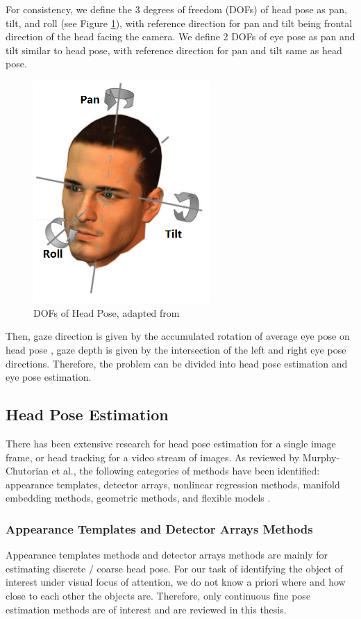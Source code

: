 For consistency, we define the 3 degrees of freedom (DOFs) of head pose as pan, tilt, and roll (see Figure \ref{fig:murphy2009head}), with reference direction for pan and tilt being frontal direction of the head facing the camera.  We define 2 DOFs of eye pose as pan and tilt similar to head pose, with reference direction for pan and tilt same as head pose.
\begin{figure} [h]
	\centering
	\includegraphics[width=0.6\textwidth]{./img/murphy2009head.png}
	\caption{DOFs of Head Pose, adapted from \cite{murphy2009head}}
	\label{fig:murphy2009head}
\end{figure}


Then, gaze direction is given by the accumulated rotation of average eye pose on head pose \cite{funes2013person}, gaze depth is given by the intersection of the left and right eye pose directions.  Therefore, the problem can be divided into head pose estimation and eye pose estimation.


\subsection{Head Pose Estimation}
There has been extensive research for head pose estimation for a single image frame, or head tracking for a video stream of images.  As reviewed by Murphy-Chutorian et al., the following categories of methods have been identified: appearance templates, detector arrays, nonlinear regression methods, manifold embedding methods, geometric methods, and flexible models \cite{murphy2009head}.


\subsubsection{Appearance Templates and Detector Arrays Methods}
Appearance templates methods and detector arrays methods are mainly for estimating discrete / coarse head pose.  For our task of identifying the object of interest under visual focus of attention, we do not know a priori where and how close to each other the objects are.  Therefore, only continuous fine pose estimation methods are of interest and are reviewed in this thesis.


